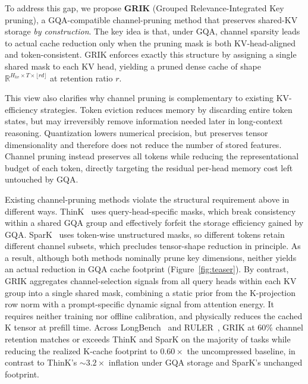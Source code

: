 \documentclass{article}
\begin{document}
To address this gap, we propose \textbf{GRIK} (Grouped Relevance-Integrated Key pruning), a GQA-compatible channel-pruning method that preserves shared-KV storage \emph{by construction}. The key idea is that, under GQA, channel sparsity leads to actual cache reduction only when the pruning mask is both KV-head-aligned and token-consistent. GRIK enforces exactly this structure by assigning a single shared mask to each KV head, yielding a pruned dense cache of shape \(\mathbb{R}^{H_{kv} \times T \times \lfloor r d \rfloor}\) at retention ratio \(r\).

This view also clarifies why channel pruning is complementary to existing KV-efficiency strategies. Token eviction reduces memory by discarding entire token states, but may irreversibly remove information needed later in long-context reasoning. Quantization lowers numerical precision, but preserves tensor dimensionality and therefore does not reduce the number of stored features. Channel pruning instead preserves all tokens while reducing the representational budget of each token, directly targeting the residual per-head memory cost left untouched by GQA.

Existing channel-pruning methods violate the structural requirement above in different ways. ThinK~\citep{think} uses query-head-specific masks, which break consistency within a shared GQA group and effectively forfeit the storage efficiency gained by GQA. SparK~\citep{spark} uses token-wise unstructured masks, so different tokens retain different channel subsets, which precludes tensor-shape reduction in principle. As a result, although both methods nominally prune key dimensions, neither yields an actual reduction in GQA cache footprint (Figure~\ref{fig:teaser}). By contrast, GRIK aggregates channel-selection signals from all query heads within each KV group into a single shared mask, combining a static prior from the K-projection row norm with a prompt-specific dynamic signal from attention energy. It requires neither training nor offline calibration, and physically reduces the cached K tensor at prefill time. Across LongBench~\citep{longbench} and RULER~\citep{ruler}, GRIK at $60\%$ channel retention matches or exceeds ThinK and SparK on the majority of tasks while reducing the realized K-cache footprint to $0.60\times$ the uncompressed baseline, in contrast to ThinK's $\sim\!3.2\times$ inflation under GQA storage and SparK's unchanged footprint.
\end{document}
